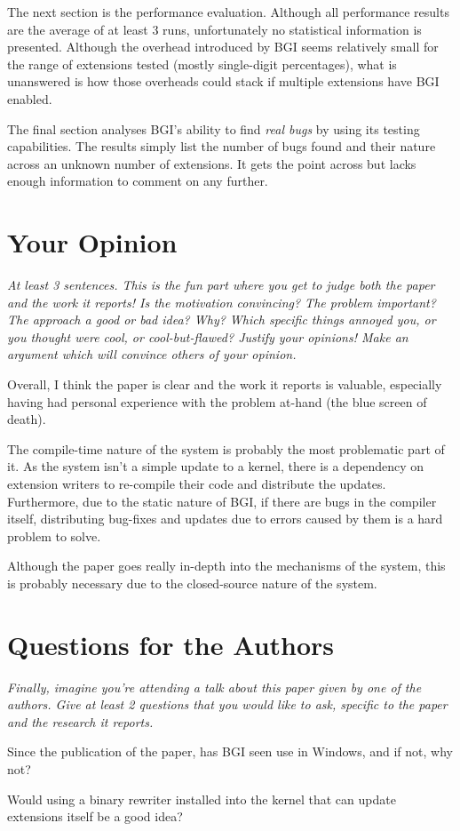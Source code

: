 \documentclass[11pt]{article}
\begin{document}
The next section is the performance evaluation. Although all performance
results are the average of at least 3 runs, unfortunately no statistical
information is presented. Although the overhead introduced by BGI seems
relatively small for the range of extensions tested (mostly single-digit
percentages), what is unanswered is how those overheads could stack if multiple
extensions have BGI enabled.

The final section analyses BGI's ability to find \textit{real bugs} by using
its testing capabilities. The results simply list the number of bugs found and
their nature across an unknown number of extensions. It gets the point across
but lacks enough information to comment on any further.


\section*{Your Opinion}

\textsl{At least 3 sentences. This is the fun part where you get to judge both
the paper and the work it reports! Is the motivation convincing? The problem
important? The approach a good or bad idea? Why? Which specific things annoyed
you, or you thought were cool, or cool-but-flawed? Justify your opinions! Make
an argument which will convince others of your opinion.}

Overall, I think the paper is clear and the work it reports is valuable,
especially having had personal experience with the problem at-hand (the blue
screen of death).

The compile-time nature of the system is probably the most problematic part of
it. As the system isn't a simple update to a kernel, there is a dependency on
extension writers to re-compile their code and distribute the updates.
Furthermore, due to the static nature of BGI, if there are bugs in the compiler
itself, distributing bug-fixes and updates due to errors caused by them is a
hard problem to solve.

Although the paper goes really in-depth into the mechanisms of the system, this
is probably necessary due to the closed-source nature of the system.


\section*{Questions for the Authors}

\textsl{Finally, imagine you're attending a talk about this paper given by one
of the authors. Give at least 2 questions that you would like to ask, specific
to the paper and the research it reports.}

Since the publication of the paper, has BGI seen use in Windows, and if not,
why not?

Would using a binary rewriter installed into the kernel that can update
extensions itself be a good idea?




\end{document}
